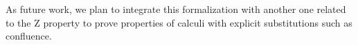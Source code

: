 As future work, we plan to integrate this formalization with another one related to the Z property \cite{fmm2021} to prove properties of calculi with explicit substitutions such as confluence\cite{nakazawaCompositionalConfluenceProofs2016,nakazawaCallbyvalue2017,kesnerPerpetualityFullSafe2008}. \begin{coqdoccode}
\end{coqdoccode}
